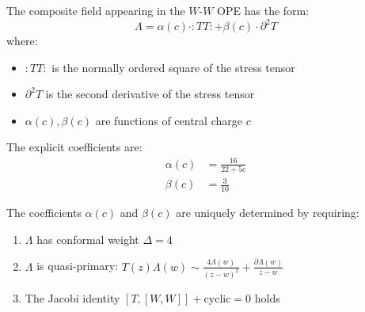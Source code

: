 \begin{definition}\label{def:lambda-complete}
The composite field appearing in the $W$-$W$ OPE has the form:
\begin{equation}
\Lambda = \alpha(c) \cdot :TT: + \beta(c) \cdot \partial^2 T
\end{equation}
where:
\begin{itemize}
\item $:TT:$ is the normally ordered square of the stress tensor
\item $\partial^2 T$ is the second derivative of the stress tensor
\item $\alpha(c), \beta(c)$ are functions of central charge $c$
\end{itemize}

The explicit coefficients are:
\begin{equation}
\boxed{
\begin{aligned}
\alpha(c) &= \frac{16}{22 + 5c} \\
\beta(c) &= \frac{3}{10}
\end{aligned}
}
\end{equation}
\end{definition}

\begin{theorem}\label{thm:lambda-coefficients-derivation}
The coefficients $\alpha(c)$ and $\beta(c)$ are uniquely determined by requiring:
\begin{enumerate}
\item $\Lambda$ has conformal weight $\Delta = 4$
\item $\Lambda$ is quasi-primary: $T(z)\Lambda(w) \sim \frac{4\Lambda(w)}{(z-w)^2} 
+ \frac{\partial\Lambda(w)}{z-w}$
\item The Jacobi identity $[T, [W, W]] + \text{cyclic} = 0$ holds
\end{enumerate}
\end{theorem}

